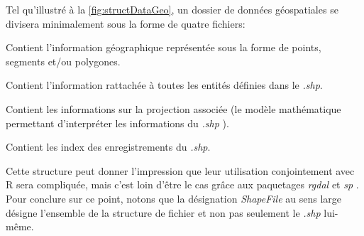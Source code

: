 Tel qu'illustré à la \autoref{fig:structDataGeo}, un dossier de données géospatiales se divisera minimalement sous la forme de quatre fichiers:
\begin{description}[style=multiline,leftmargin=1.5cm]
	\item[\emph{.shp}] Contient l'information géographique représentée sous la forme de points, segments et/ou polygones.
	\item[\emph{.dbf}] Contient l'information rattachée à toutes les entités définies dans le \emph{.shp}.
	\item[\emph{.prj}] Contient les informations sur la projection associée (le modèle mathématique permettant d'interpréter les informations du \emph{.shp} \cite{projectionSIG}).
	\item[{.shx}] Contient les index des enregistrements du \emph{.shp}.
\end{description}
Cette structure peut donner l'impression que leur utilisation conjointement avec R sera compliquée, mais c'est loin d'être le cas grâce aux paquetages \emph{rgdal} \cite{Rpackage:rgdal} et \emph{sp}\cite{Rpackage:sp} . Pour conclure sur ce point, notons que la désignation \emph{ShapeFile} au sens large désigne l'ensemble de la structure de fichier et non pas seulement le \emph{.shp} lui-même. \cite{portailSIG} \\

